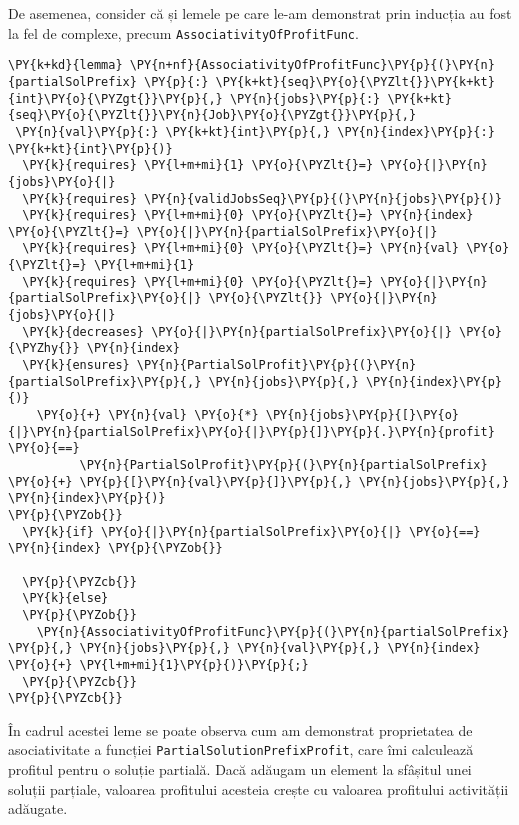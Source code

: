 De asemenea, consider că și lemele pe care le-am demonstrat prin inducția au fost la fel de complexe, precum \texttt{AssociativityOfProfitFunc}.

\begin{Verbatim}[commandchars=\\\{\},fontsize=\footnotesize]
\PY{k+kd}{lemma} \PY{n+nf}{AssociativityOfProfitFunc}\PY{p}{(}\PY{n}{partialSolPrefix} \PY{p}{:} \PY{k+kt}{seq}\PY{o}{\PYZlt{}}\PY{k+kt}{int}\PY{o}{\PYZgt{}}\PY{p}{,} \PY{n}{jobs}\PY{p}{:} \PY{k+kt}{seq}\PY{o}{\PYZlt{}}\PY{n}{Job}\PY{o}{\PYZgt{}}\PY{p}{,}
 \PY{n}{val}\PY{p}{:} \PY{k+kt}{int}\PY{p}{,} \PY{n}{index}\PY{p}{:} \PY{k+kt}{int}\PY{p}{)}
  \PY{k}{requires} \PY{l+m+mi}{1} \PY{o}{\PYZlt{}=} \PY{o}{|}\PY{n}{jobs}\PY{o}{|}
  \PY{k}{requires} \PY{n}{validJobsSeq}\PY{p}{(}\PY{n}{jobs}\PY{p}{)}
  \PY{k}{requires} \PY{l+m+mi}{0} \PY{o}{\PYZlt{}=} \PY{n}{index} \PY{o}{\PYZlt{}=} \PY{o}{|}\PY{n}{partialSolPrefix}\PY{o}{|}
  \PY{k}{requires} \PY{l+m+mi}{0} \PY{o}{\PYZlt{}=} \PY{n}{val} \PY{o}{\PYZlt{}=} \PY{l+m+mi}{1}
  \PY{k}{requires} \PY{l+m+mi}{0} \PY{o}{\PYZlt{}=} \PY{o}{|}\PY{n}{partialSolPrefix}\PY{o}{|} \PY{o}{\PYZlt{}} \PY{o}{|}\PY{n}{jobs}\PY{o}{|} 
  \PY{k}{decreases} \PY{o}{|}\PY{n}{partialSolPrefix}\PY{o}{|} \PY{o}{\PYZhy{}} \PY{n}{index}
  \PY{k}{ensures} \PY{n}{PartialSolProfit}\PY{p}{(}\PY{n}{partialSolPrefix}\PY{p}{,} \PY{n}{jobs}\PY{p}{,} \PY{n}{index}\PY{p}{)} 
    \PY{o}{+} \PY{n}{val} \PY{o}{*} \PY{n}{jobs}\PY{p}{[}\PY{o}{|}\PY{n}{partialSolPrefix}\PY{o}{|}\PY{p}{]}\PY{p}{.}\PY{n}{profit} \PY{o}{==}
          \PY{n}{PartialSolProfit}\PY{p}{(}\PY{n}{partialSolPrefix} \PY{o}{+} \PY{p}{[}\PY{n}{val}\PY{p}{]}\PY{p}{,} \PY{n}{jobs}\PY{p}{,} \PY{n}{index}\PY{p}{)}
\PY{p}{\PYZob{}}
  \PY{k}{if} \PY{o}{|}\PY{n}{partialSolPrefix}\PY{o}{|} \PY{o}{==} \PY{n}{index} \PY{p}{\PYZob{}}

  \PY{p}{\PYZcb{}}
  \PY{k}{else}
  \PY{p}{\PYZob{}}
    \PY{n}{AssociativityOfProfitFunc}\PY{p}{(}\PY{n}{partialSolPrefix} \PY{p}{,} \PY{n}{jobs}\PY{p}{,} \PY{n}{val}\PY{p}{,} \PY{n}{index} \PY{o}{+} \PY{l+m+mi}{1}\PY{p}{)}\PY{p}{;}
  \PY{p}{\PYZcb{}}
\PY{p}{\PYZcb{}}
\end{Verbatim}

În cadrul acestei leme se poate observa cum am demonstrat proprietatea de asociativitate a funcției  \texttt{PartialSolutionPrefixProfit}, care îmi calculează profitul pentru o soluție partială. Dacă adăugam un element la sfâșitul unei soluții parțiale, valoarea profitului acesteia crește cu valoarea profitului activității adăugate. 
\\

